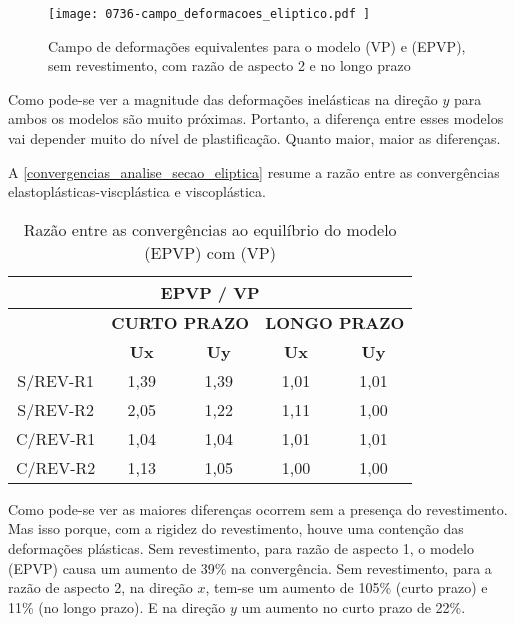 \begin{figure}[H]
	\begin{center}
		\texttt{[image: 0736-campo\_deformacoes\_eliptico.pdf
		]}
	\end{center}
	\caption{\label{campo_deformacoes_eliptico}Campo de deformações equivalentes para o modelo (VP) e (EPVP), sem revestimento, com razão de aspecto 2 e no longo prazo}
\end{figure}

Como pode-se ver a magnitude das deformações inelásticas na direção $y$ para ambos os modelos são muito próximas. Portanto, a diferença entre esses modelos vai depender muito do nível de plastificação. Quanto maior, maior as diferenças.

A \autoref{convergencias_analise_secao_eliptica} resume a razão entre as convergências elastoplásticas-viscplástica e viscoplástica.

\begin{table}[H]
	\caption{Razão entre as convergências ao equilíbrio do modelo (EPVP) com (VP)}
	\label{convergencias_analise_secao_eliptica}
	\centering
	\small
	\renewcommand{\arraystretch}{1.25}
	\begin{tabular}{c c c c c}
		\hline
		\multicolumn{5}{c}{\textbf{EPVP / VP}}\\	
		\hline
		\multicolumn{1}{c}{} &
		\multicolumn{2}{c}{\textbf{CURTO PRAZO}} &
		\multicolumn{2}{c}{\textbf{LONGO PRAZO}}	\\
		\multicolumn{1}{c}{} &
		\multicolumn{1}{c}{\textbf{Ux}} &
		\multicolumn{1}{c}{\textbf{Uy}} &
		\multicolumn{1}{c}{\textbf{Ux}} &
		\multicolumn{1}{c}{\textbf{Uy}} \\
		\hline
		S/REV-R1	 &	1,39 &	1,39 &	1,01 &	1,01 \\
		S/REV-R2	 &	2,05 &	1,22 &	1,11 &	1,00 \\
		C/REV-R1	 &	1,04 &	1,04 &	1,01 &	1,01 \\
		C/REV-R2	 &	1,13 &	1,05 &	1,00 &	1,00 \\
		\hline
	\end{tabular}
	\normalsize
\end{table}

Como pode-se ver as maiores diferenças ocorrem sem a presença do revestimento. Mas isso porque, com a rigidez do revestimento, houve uma contenção das deformações plásticas. Sem revestimento, para razão de aspecto 1, o modelo (EPVP) causa um aumento de 39\% na convergência. Sem revestimento, para a razão de aspecto 2, na direção $x$, tem-se um aumento de 105\% (curto prazo) e 11\% (no longo prazo). E na direção $y$ um aumento no curto prazo de 22\%.

